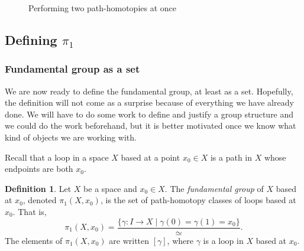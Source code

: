 \documentclass{article}
\theoremstyle{definition}
\newtheorem{defi}[thm]{Definition}
\theoremstyle{remark}
\numberwithin{figure}{section}
\begin{document}
\begin{figure}[h]
	\centering
	\caption{Performing two path-homotopies at once}
	\label{fig:transitive homotopies}
\end{figure}

\subsection{Defining $\pi_1$}
\subsubsection{Fundamental group as a set}
We are now ready to define the fundamental group, at least as a set. Hopefully, the definition will not come as a surprise because of everything we have already done. We will have to do some work to define and justify a group structure and we could do the work beforehand, but it is better motivated once we know what kind of objects we are working with.

Recall that a loop in a space $X$ based at a point $x_0 \in X$ is a path in $X$ whose endpoints are both $x_0$.

\begin{defi}
	Let $X$ be a space and $x_0 \in X$. The \emph{fundamental group} of $X$ based at $x_0$, denoted $\pi_1(X, x_0)$, is the set of path-homotopy classes of loops based at $x_0$. That is,
	\[
	\pi_1(X, x_0) = \frac{\{\gamma : I \to X \mid \gamma(0) = \gamma(1) = x_0\}}{\simeq}.
	\]
	The elements of $\pi_1(X, x_0)$ are written $[\gamma]$, where $\gamma$ is a loop in $X$ based at $x_0$.
\end{defi}
\end{document}
